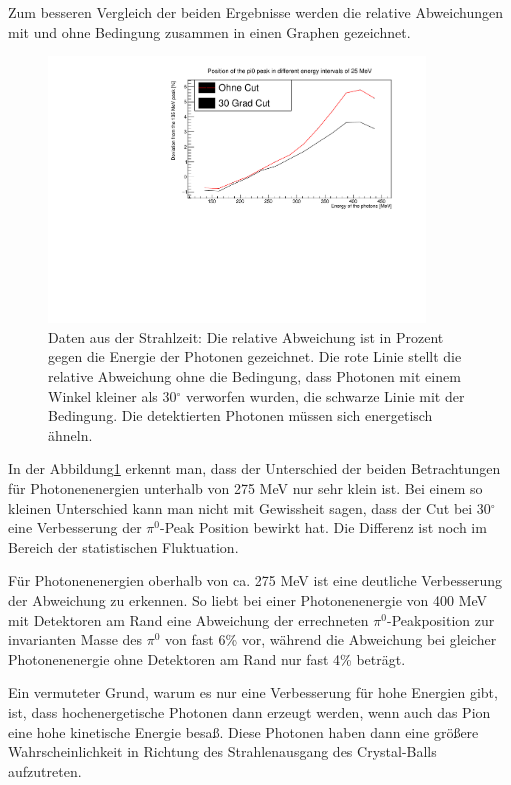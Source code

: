 \documentclass[a4paper,11pt,oneside,final,german,openbib,pdftex]{scrbook}
\begin{document}
{Zum besseren Vergleich der beiden Ergebnisse werden die relative Abweichungen mit und ohne Bedingung zusammen in einen Graphen gezeichnet.
\begin{figure}[h!]
	\begin{center}
		\includegraphics[width=100mm]{NewCalib/Strahlzeit2014/20171904RealBothDeviation}
		\caption[Strahlzeit: Symmetrische Photonen; Vernachl\"assigung der Detektoren am Rand; Abweichung]{Daten aus der Strahlzeit: Die relative Abweichung ist in Prozent gegen die Energie der Photonen gezeichnet. Die rote Linie stellt die relative Abweichung ohne die Bedingung, dass Photonen mit einem Winkel kleiner als 30$^{\circ}$ verworfen wurden, die schwarze Linie mit der Bedingung. Die detektierten Photonen m\"ussen sich energetisch \"ahneln.}
		\label{fig:Vernachlaessigung-Detektoren-am-Rand}
	\end{center}
\end{figure}

 

In der Abbildung\ref{fig:Vernachlaessigung-Detektoren-am-Rand} erkennt man, dass der Unterschied der beiden Betrachtungen f\"ur Photonenenergien unterhalb von 275 MeV nur sehr klein ist. Bei einem so kleinen Unterschied kann man nicht mit Gewissheit sagen, dass der Cut bei 30$^{\circ}$ eine Verbesserung der $\pi^0$-Peak Position bewirkt hat. Die Differenz ist noch im Bereich der statistischen Fluktuation. 

F\"ur Photonenenergien oberhalb von ca. 275 MeV ist eine deutliche Verbesserung der Abweichung zu erkennen. So liebt bei einer Photonenenergie von 400 MeV mit Detektoren am Rand eine Abweichung der errechneten $\pi^0$-Peakposition zur invarianten Masse des $\pi^0$ von fast 6\% vor, w\"ahrend die Abweichung bei gleicher Photonenenergie ohne Detektoren am Rand nur fast 4\% betr\"agt.

Ein vermuteter Grund, warum es nur eine Verbesserung für hohe Energien gibt, ist, dass hochenergetische Photonen dann erzeugt werden, wenn auch das Pion eine hohe kinetische Energie besa{\ss}. Diese Photonen haben dann eine gr\"o{\ss}ere Wahrscheinlichkeit in Richtung des Strahlenausgang des Crystal-Balls aufzutreten.

}
\end{document}
